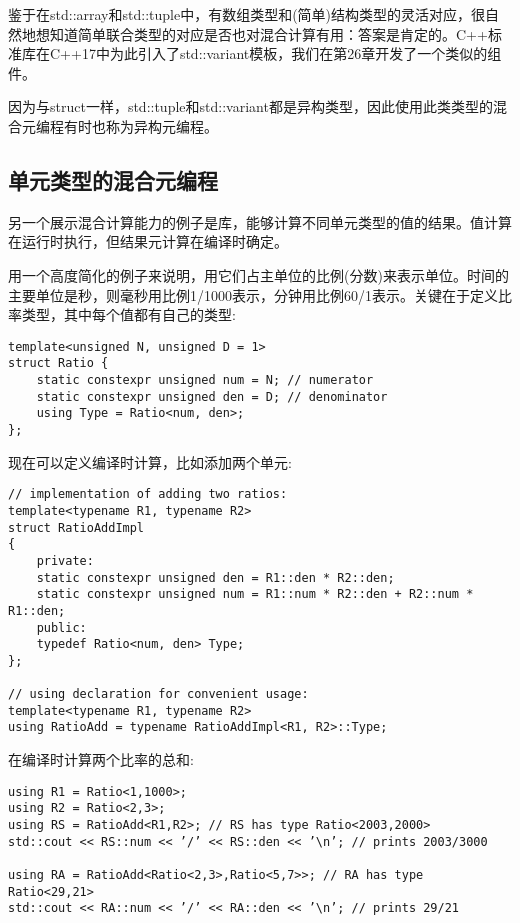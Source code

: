 鉴于在std::array和std::tuple中，有数组类型和(简单)结构类型的灵活对应，很自然地想知道简单联合类型的对应是否也对混合计算有用：答案是肯定的。C++标准库在C++17中为此引入了std::variant模板，我们在第26章开发了一个类似的组件。

因为与struct一样，std::tuple和std::variant都是异构类型，因此使用此类类型的混合元编程有时也称为异构元编程。

\subsection{单元类型的混合元编程}

另一个展示混合计算能力的例子是库，能够计算不同单元类型的值的结果。值计算在运行时执行，但结果元计算在编译时确定。

用一个高度简化的例子来说明，用它们占主单位的比例(分数)来表示单位。时间的主要单位是秒，则毫秒用比例1/1000表示，分钟用比例60/1表示。关键在于定义比率类型，其中每个值都有自己的类型:

\begin{lstlisting}[style=styleCXX]
template<unsigned N, unsigned D = 1>
struct Ratio {
	static constexpr unsigned num = N; // numerator
	static constexpr unsigned den = D; // denominator
	using Type = Ratio<num, den>;
};
\end{lstlisting}

现在可以定义编译时计算，比如添加两个单元:

\begin{lstlisting}[style=styleCXX]
// implementation of adding two ratios:
template<typename R1, typename R2>
struct RatioAddImpl
{
	private:
	static constexpr unsigned den = R1::den * R2::den;
	static constexpr unsigned num = R1::num * R2::den + R2::num * R1::den;
	public:
	typedef Ratio<num, den> Type;
};

// using declaration for convenient usage:
template<typename R1, typename R2>
using RatioAdd = typename RatioAddImpl<R1, R2>::Type;
\end{lstlisting}

在编译时计算两个比率的总和:

\begin{lstlisting}[style=styleCXX]
using R1 = Ratio<1,1000>;
using R2 = Ratio<2,3>;
using RS = RatioAdd<R1,R2>; // RS has type Ratio<2003,2000>
std::cout << RS::num << ’/’ << RS::den << ’\n’; // prints 2003/3000

using RA = RatioAdd<Ratio<2,3>,Ratio<5,7>>; // RA has type Ratio<29,21>
std::cout << RA::num << ’/’ << RA::den << ’\n’; // prints 29/21
\end{lstlisting}


